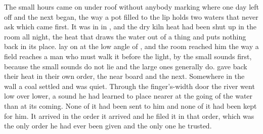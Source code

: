 
The small hours came on under  roof without anybody marking where one day left off and the next began, the way a pot filled to the lip holds two waters that never ask which came first. It was  in  in , and the dry kiln heat had been shut up in the room all night, the heat that draws the water out of a thing and puts nothing back in its place.  lay on  at the low angle of , and the room reached him the way a field reaches a man who must walk it before the light, by the small sounds first, because the small sounds do not lie and the large ones generally do.  gave back their heat in their own order, the near board and the next. Somewhere in the wall a coal settled and was quiet. Through the finger's-width door the river went low over lower, a sound he had learned to place nearer at the going of the water than at its coming. None of it had been sent to him and none of it had been kept for him. It arrived in the order it arrived and he filed it in that order, which was the only order he had ever been given and the only one he trusted.

